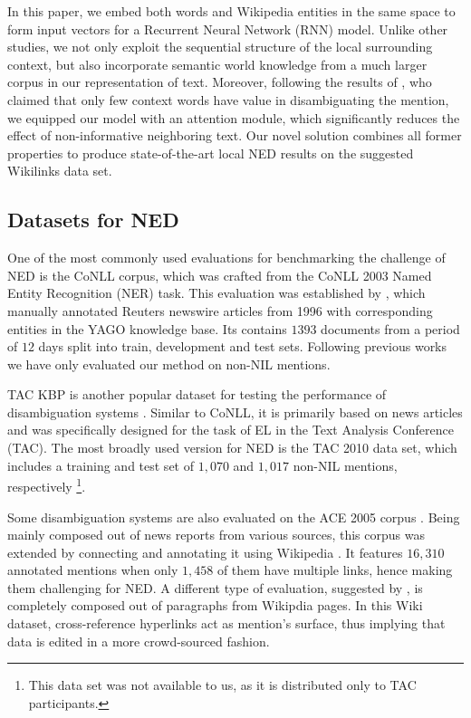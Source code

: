 \documentclass[11pt]{article}
\begin{document}
In this paper, we embed both words and Wikipedia entities in the same space to form input vectors for a Recurrent Neural Network (RNN) model. Unlike other studies, we not only exploit the sequential structure of the local surrounding context, but also incorporate semantic world knowledge from a much larger corpus in our representation of text. Moreover, following the results of , who claimed that only few context words have value in disambiguating the mention, we equipped our model with an attention module, which significantly reduces the effect of non-informative neighboring text. Our novel solution combines all former properties to produce state-of-the-art local NED results on the suggested Wikilinks data set.

\subsection{Datasets for NED}

One of the most commonly used evaluations for benchmarking the challenge of NED \cite{Globerson2016,Hachey2013,yamada2016joint,Pershina2015} is the CoNLL corpus, which was crafted from the CoNLL 2003 Named Entity Recognition (NER) task. This evaluation was established by , which manually annotated Reuters newswire articles from 1996 with corresponding entities in the YAGO knowledge base. Its contains $1393$ documents from a period of $12$ days split into train, development and test sets. Following previous works we have only evaluated our method on non-NIL mentions.

TAC KBP \cite{ji2010overview} is another popular dataset for testing the performance of disambiguation systems \cite{chisholm2015entity,Globerson2016,sun2015modeling}. Similar to CoNLL, it is primarily based on news articles and was specifically designed for the task of EL in the Text Analysis Conference (TAC). The most broadly used version for NED is the TAC 2010 data set, which includes a training and test set of $1,070$ and $1,017$ non-NIL mentions, respectively \footnote{This data set was not available to us, as it is distributed only to TAC participants.}.

Some disambiguation systems are also evaluated on the ACE 2005 corpus \cite{Ratinov2011,francis2016capturing}. Being mainly composed out of news reports from various sources, this corpus was extended by connecting and annotating it using Wikipedia \cite{bentivogli2010extending}. It features $16,310$ annotated mentions when only $1,458$ of them have multiple links, hence making them challenging for NED. A different type of evaluation, suggested by , is completely composed out of paragraphs from Wikipdia pages. In this Wiki dataset, cross-reference hyperlinks act as mention's surface, thus implying that data is edited in a more crowd-sourced fashion.
\end{document}
